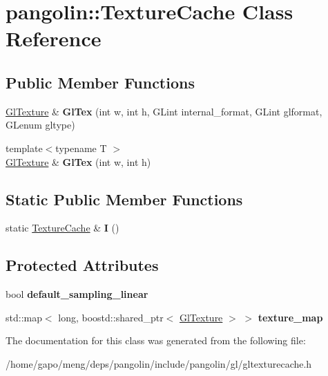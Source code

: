 \hypertarget{classpangolin_1_1_texture_cache}{}\section{pangolin\+:\+:Texture\+Cache Class Reference}
\label{classpangolin_1_1_texture_cache}
\subsection*{Public Member Functions}
\begin{DoxyCompactItemize}
\item 
\hyperlink{classpangolin_1_1_gl_texture}{Gl\+Texture} \& {\bfseries Gl\+Tex} (int w, int h, G\+Lint internal\+\_\+format, G\+Lint glformat, G\+Lenum gltype)\hypertarget{classpangolin_1_1_texture_cache_ac0ac9e8698d23b54f7b28a83af2938b8}{}\label{classpangolin_1_1_texture_cache_ac0ac9e8698d23b54f7b28a83af2938b8}

\item 
{\footnotesize template$<$typename T $>$ }\\\hyperlink{classpangolin_1_1_gl_texture}{Gl\+Texture} \& {\bfseries Gl\+Tex} (int w, int h)\hypertarget{classpangolin_1_1_texture_cache_a070a94044a40d7156ec8d6ea578bb0c1}{}\label{classpangolin_1_1_texture_cache_a070a94044a40d7156ec8d6ea578bb0c1}

\end{DoxyCompactItemize}
\subsection*{Static Public Member Functions}
\begin{DoxyCompactItemize}
\item 
static \hyperlink{classpangolin_1_1_texture_cache}{Texture\+Cache} \& {\bfseries I} ()\hypertarget{classpangolin_1_1_texture_cache_af76862570e07ab2ce8f140b15f7f5a0b}{}\label{classpangolin_1_1_texture_cache_af76862570e07ab2ce8f140b15f7f5a0b}

\end{DoxyCompactItemize}
\subsection*{Protected Attributes}
\begin{DoxyCompactItemize}
\item 
bool {\bfseries default\+\_\+sampling\+\_\+linear}\hypertarget{classpangolin_1_1_texture_cache_afe66eb49ba5077914885c329f686b64b}{}\label{classpangolin_1_1_texture_cache_afe66eb49ba5077914885c329f686b64b}

\item 
std\+::map$<$ long, boostd\+::shared\+\_\+ptr$<$ \hyperlink{classpangolin_1_1_gl_texture}{Gl\+Texture} $>$ $>$ {\bfseries texture\+\_\+map}\hypertarget{classpangolin_1_1_texture_cache_a27d3d17fd66266a057bc2dffe91a4c3f}{}\label{classpangolin_1_1_texture_cache_a27d3d17fd66266a057bc2dffe91a4c3f}

\end{DoxyCompactItemize}


The documentation for this class was generated from the following file\+:\begin{DoxyCompactItemize}
\item 
/home/gapo/meng/deps/pangolin/include/pangolin/gl/gltexturecache.\+h\end{DoxyCompactItemize}
